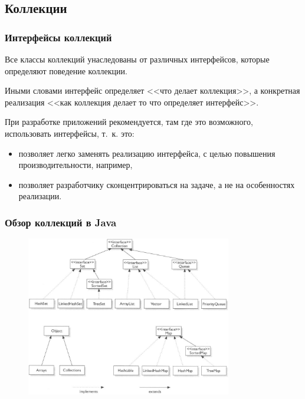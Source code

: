 \documentclass[default]{beamer}
\begin{document}
	\subsection{Коллекции}
	\begin{frame}
		\frametitle{Интерфейсы коллекций}
		
		Все классы коллекций унаследованы от различных интерфейсов, которые определяют поведение коллекции.
		
		Иными словами интерфейс определяет <<что делает коллекция>>, а конкретная реализация <<как коллекция делает то что определяет интерфейс>>.
		
		При разработке приложений рекомендуется, там где это возможного, использовать интерфейсы, т.~к. это:
		\begin{itemize}
			\item позволяет легко заменять реализацию интерфейса, с целью повышения производительности, например,
			\item позволяет разработчику сконцентрироваться на задаче, а не на особенностях реализации.
		\end{itemize}
	\end{frame}

	\begin{frame}
		\frametitle{Обзор коллекций в Java}
		
		\begin{figure}
			\includegraphics[width=0.8\textwidth]{col_classes}
		\end{figure}
	\end{frame}
\end{document}
